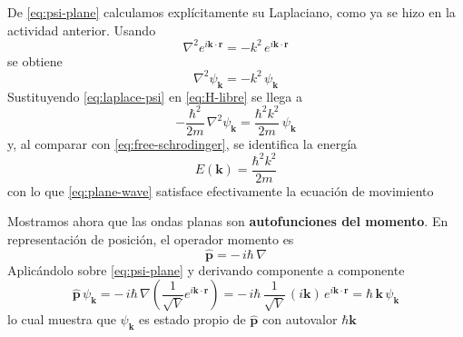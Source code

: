 \documentclass{article}
\begin{document}
De \eqref{eq:psi-plane} calculamos explícitamente su Laplaciano, como ya se hizo en la actividad anterior. Usando
\[
\nabla^2 e^{i\mathbf k\cdot\mathbf r}=-k^2\,e^{i\mathbf k\cdot\mathbf r}
\]
se obtiene
\begin{equation}\label{eq:laplace-psi}
\nabla^2 \psi_{\mathbf k}=-k^2\,\psi_{\mathbf k}
\end{equation}
Sustituyendo \eqref{eq:laplace-psi} en \eqref{eq:H-libre} se llega a
\begin{equation}\label{eq:Sch-libre-resuelta}
-\frac{\hbar^2}{2m}\,\nabla^2\psi_{\mathbf k}
=\frac{\hbar^2 k^2}{2m}\,\psi_{\mathbf k}
\end{equation}
y, al comparar con \eqref{eq:free-schrodinger}, se identifica la energía
\begin{equation}\label{eq:E-k}
E(\mathbf k)=\frac{\hbar^2 k^2}{2m}
\end{equation}
con lo que \eqref{eq:plane-wave} satisface efectivamente la ecuación de movimiento

Mostramos ahora que las ondas planas son \textcolor{Cerulean}{\textbf{autofunciones del momento}}. En representación de posición, el operador momento es
\begin{equation}\label{eq:p-operator}
\hat{\mathbf p}=-\,i\hbar\,\nabla
\end{equation}
Aplicándolo sobre \eqref{eq:psi-plane} y derivando componente a componente
\begin{equation}\label{eq:p-sobre-psi}
\hat{\mathbf p}\,\psi_{\mathbf k}
=-\,i\hbar\,\nabla\!\left(\frac{1}{\sqrt V}e^{i\mathbf k\cdot\mathbf r}\right)
=-\,i\hbar\,\frac{1}{\sqrt V}\,(i\mathbf k)\,e^{i\mathbf k\cdot\mathbf r}
=\hbar\,\mathbf k\,\psi_{\mathbf k}
\end{equation}
lo cual muestra que $\psi_{\mathbf k}$ es estado propio de $\hat{\mathbf p}$ con autovalor $\hbar\mathbf k$
\end{document}
